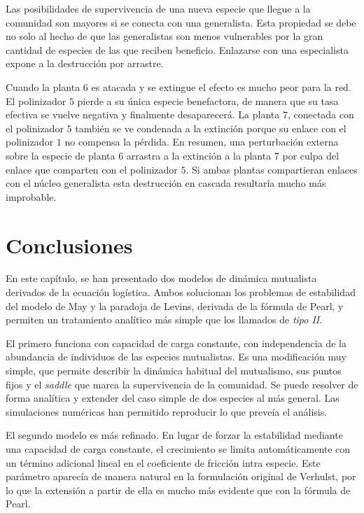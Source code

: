 Las posibilidades de supervivencia de una nueva especie que llegue a la comunidad son mayores si se conecta con una generalista. Esta propiedad se debe no solo al hecho de que las generalistas son menos vulnerables por la gran cantidad de especies de las que reciben beneficio. Enlazarse con una especialista expone a la destrucción por arrastre.

Cuando la planta $6$ es atacada y se extingue el efecto es mucho peor para la red. El polinizador $5$ pierde a su única especie benefactora, de manera que su tasa efectiva se vuelve negativa y finalmente desaparecerá. La planta $7$, conectada con el polinizador $5$ también se ve condenada a la extinción porque su enlace con el polinizador $1$ no compensa la pérdida. En resumen, una perturbación externa sobre la especie de planta $6$ arrastra a la extinción a la planta $7$ por culpa del enlace que comparten con el polinizador $5$. Si ambas plantas compartieran enlaces con el núcleo generalista esta destrucción en cascada resultaría mucho más improbable.

\section{Conclusiones}

En este capítulo, se han presentado dos modelos de dinámica mutualista derivados de la ecuación logística. Ambos solucionan los problemas de estabilidad del modelo de May y la paradoja de Levins, derivada de la fórmula de Pearl, y permiten un tratamiento analítico más simple que los llamados de \textit{tipo II}.

El primero funciona con capacidad de carga constante, con independencia de la abundancia de individuos de las especies mutualistas. Es una modificación muy simple, que permite describir la dinámica habitual del mutualismo, sus puntos fijos y el \textit{saddle} que marca la supervivencia de la comunidad. Se puede resolver de forma analítica y extender del caso simple de dos especies al más general. Las simulaciones numéricas han permitido reproducir lo que preveía el análisis.

El segundo modelo es más refinado. En lugar de forzar la estabilidad mediante una capacidad de carga constante, el crecimiento se limita automáticamente con un término adicional lineal en el coeficiente de fricción intra especie. Este parámetro aparecía de manera natural en la formulación original de Verhulst, por lo que la extensión a partir de ella es mucho más evidente que con la fórmula de Pearl.

